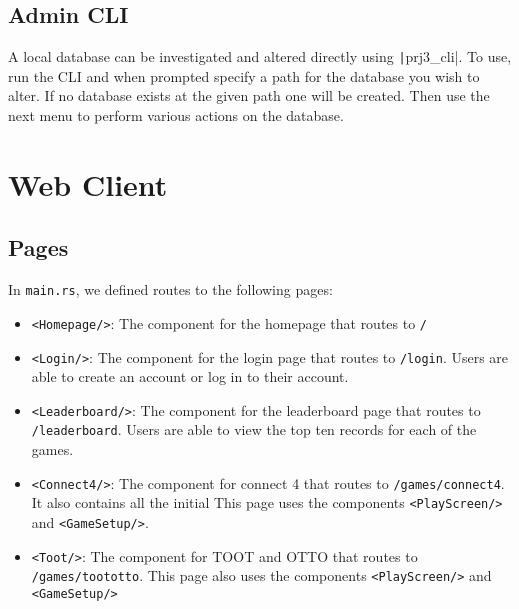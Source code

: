 \documentclass{article}
\begin{document}
\pagebreak

\subsection{Admin CLI}

A local database can be investigated and altered directly using \texttt|prj3_cli|.
To use, run the CLI and when prompted specify a path for the database you wish to alter.
If no database exists at the given path one will be created.  Then use the next menu to perform various actions on the database.

\section{Web Client}

\subsection{Pages}
In \texttt{main.rs}, we defined routes to the following pages:
\begin{itemize}
  \item \texttt{<Homepage/>}: The component for the homepage that routes to \texttt{/}
  \item \texttt{<Login/>}: The component for the login page that routes to \texttt{/login}. Users are able to create an account or log in to their account.
  \item \texttt{<Leaderboard/>}: The component for the leaderboard page that routes to \texttt{/leaderboard}. Users are able to view the top ten records for each of the games.
  \item \texttt{<Connect4/>}: The component for connect 4 that routes to \texttt{/games/connect4}. It also contains all the initial This page uses the components \texttt{<PlayScreen/>} and \texttt{<GameSetup/>}.
  \item \texttt{<Toot/>}: The component for TOOT and OTTO that routes to \texttt{/games/toototto}. This page also uses the components \texttt{<PlayScreen/>} and \texttt{<GameSetup/>}
\end{itemize}
\end{document}
